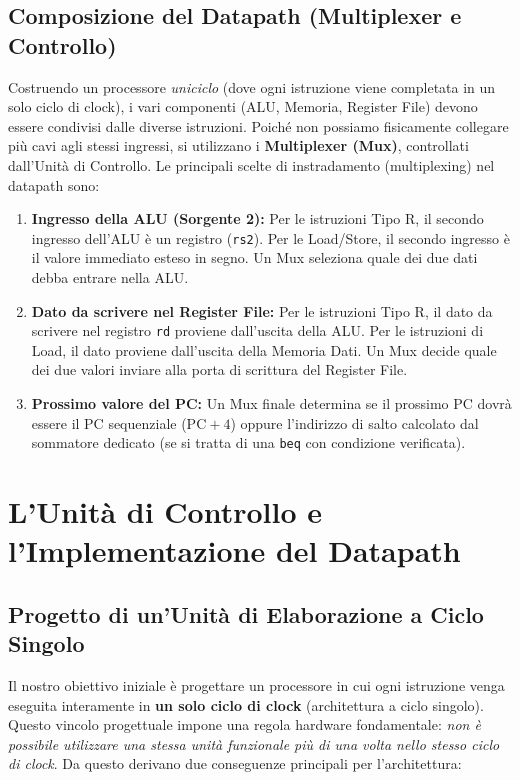 \documentclass[12pt, a4paper]{article}
\begin{document}
\subsection{Composizione del Datapath (Multiplexer e Controllo)}
Costruendo un processore \textit{uniciclo} (dove ogni istruzione viene completata in un solo ciclo di clock), i vari componenti (ALU, Memoria, Register File) devono essere condivisi dalle diverse istruzioni. Poiché non possiamo fisicamente collegare più cavi agli stessi ingressi, si utilizzano i \textbf{Multiplexer (Mux)}, controllati dall'Unità di Controllo.
Le principali scelte di instradamento (multiplexing) nel datapath sono:
\begin{enumerate}
    \item \textbf{Ingresso della ALU (Sorgente 2):} Per le istruzioni Tipo R, il secondo ingresso dell'ALU è un registro (\texttt{rs2}). Per le Load/Store, il secondo ingresso è il valore immediato esteso in segno. Un Mux seleziona quale dei due dati debba entrare nella ALU.
    \item \textbf{Dato da scrivere nel Register File:} Per le istruzioni Tipo R, il dato da scrivere nel registro \texttt{rd} proviene dall'uscita della ALU. Per le istruzioni di Load, il dato proviene dall'uscita della Memoria Dati. Un Mux decide quale dei due valori inviare alla porta di scrittura del Register File.
    \item \textbf{Prossimo valore del PC:} Un Mux finale determina se il prossimo PC dovrà essere il PC sequenziale ($\text{PC} + 4$) oppure l'indirizzo di salto calcolato dal sommatore dedicato (se si tratta di una \texttt{beq} con condizione verificata).
\end{enumerate}


\section{L'Unità di Controllo e l'Implementazione del Datapath}

\subsection{Progetto di un'Unità di Elaborazione a Ciclo Singolo}
Il nostro obiettivo iniziale è progettare un processore in cui ogni istruzione venga eseguita interamente in \textbf{un solo ciclo di clock} (architettura a ciclo singolo). Questo vincolo progettuale impone una regola hardware fondamentale: \textit{non è possibile utilizzare una stessa unità funzionale più di una volta nello stesso ciclo di clock}. 
Da questo derivano due conseguenze principali per l'architettura:
\end{document}
